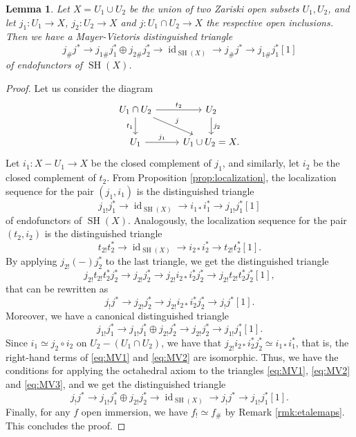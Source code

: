 \documentclass[10pt]{amsart}
\theoremstyle{definition}
\theoremstyle{plain}
\newtheorem{lemma}[defn]{Lemma}
\numberwithin{equation}{section}
\newcommand{\0}{\emptyset}
\newcommand{\SH}{{\operatorname{SH}}}
\newcommand{\id}{{\operatorname{id}}}
\begin{document}
\begin{lemma}
\label{lemma:Mayer-Vietoris}
    Let $X=U_1 \cup U_2$ be the union of two Zariski open subsets $U_1, U_2$, and let $j_1:U_1 \to X$, $j_2: U_2 \to X$ and $j:U_1 \cap U_2 \to X$ the respective open inclusions. Then we have a Mayer-Vietoris distinguished triangle
    $$j_\#j^* \to j_{1\#}j_1^* \oplus j_{2\#}j_2^* \to \id_{\SH(X)} \to j_\#j^* \to j_{1\#}j_1^*[1]$$
    of endofunctors of $\SH(X)$.
\end{lemma}

\begin{proof}
    Let us consider the diagram
$$
\begin{tikzcd}
    U_1 \cap U_2 \arrow[r, "t_2"] \arrow[d, swap, "t_1"] \arrow[dr, "j"] & U_2\arrow[d, "j_2"] \\
    U_1 \arrow[r, "j_1"] & U_1 \cup U_2 =X.
\end{tikzcd}
$$
Let $i_1: X-U_1 \to X$ be the closed complement of $j_1$, and similarly, let $i_2$ be the closed complement of $t_2$. From Proposition \ref{prop:localization}, the localization sequence for the pair $(j_1,i_1)$ is the distinguished triangle 
\begin{equation}
\label{eq:MV1}
    j_{1!}j_1^*\to \id_{\SH(X)} \to i_{1*}i_1^* \to j_{1!}j_1^*[1]
\end{equation}
of endofunctors of $\SH(X)$. Analogously, the localization sequence for the pair $(t_2,i_2)$ is the distinguished triangle
$$t_{2!}t_2^* \to \id_{\SH(X)} \to i_{2*}i_2^* \to t_{2!}t_2^*[1].$$
By applying $j_{2!}(-)j_2^*$ to the last triangle, we get the distinguished triangle
$$j_{2!}t_{2!}t_2^*j_2^* \to j_{2!}j_2^* \to j_{2!}i_{2*}i_2^*j_2^* \to j_{2!}t_{2!}t_2^*j_2^*[1],$$
that can be rewritten as 
\begin{equation}
\label{eq:MV2}
     j_!j^* \to j_{2!}j_2^* \to j_{2!}i_{2*}i_2^*j_2^* \to j_!j^*[1].
\end{equation}
Moreover, we have a canonical distinguished triangle
\begin{equation}
\label{eq:MV3}
    j_{1!}j_1^* \to j_{1!}j_1^* \oplus j_{2!}j_2^* \to j_{2!}j_2^* \to j_{1!}j_1^*[1]. 
\end{equation}
Since $i_1 \simeq j_2 \circ i_2$ on $U_2-(U_1\cap U_2)$, we have that $j_{2!}i_{2*}i_2^*j_2^* \simeq i_{1*}i_1^*$, that is, the right-hand terms of \eqref{eq:MV1} and \eqref{eq:MV2} are isomorphic. Thus, we have the conditions for applying the octahedral axiom to the triangles \eqref{eq:MV1}, \eqref{eq:MV2} and \eqref{eq:MV3}, and we get the distinguished triangle
$$j_!j^* \to j_{1!}j_1^* \oplus j_{2!}j_2^* \to \id_{\SH(X)} \to j_!j^* \to j_{1!}j_1^*[1].$$
Finally, for any $f$ open immersion, we have $f_!\simeq f_\#$ by Remark \ref{rmk:etalemaps}. This concludes the proof.
\end{proof}
\end{document}
